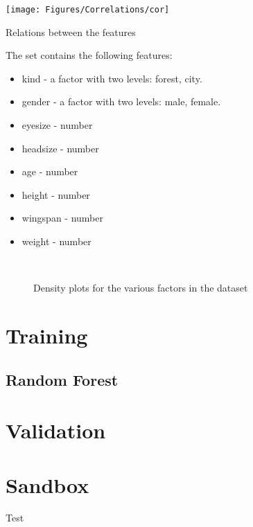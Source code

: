 \documentclass[11pt,a4paper,oldtoc,final]{tufte-book}
\begin{document}
\begin{marginfigure}
    \texttt{[image: Figures/Correlations/cor]}
    \caption{Relations between the features}
\end{marginfigure}

The set contains the following features:
\begin{itemize}
    \item kind     - a factor with two levels: forest, city.
    \item gender   - a factor with two levels: male, female.
    \item eyesize  - number
    \item headsize - number
    \item age      - number
    \item height   - number
    \item wingspan - number
    \item weight   - number
\end{itemize}


\begin{figure*}
     \\
     \caption{Density plots for the various factors in the dataset}
\end{figure*}


\chapter{Training}

\section{Random Forest}

\cite{Breiman2001}

\chapter{Validation}

\chapter{Sandbox}

Test \cite{Tufte2006}




%


%

\backmatter




\printindex
\end{document}
